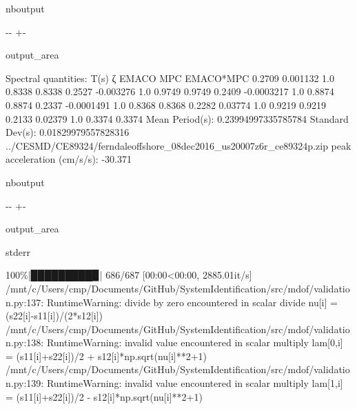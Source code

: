 \documentclass[letterpaper,10pt,english]{sphinxmanual}
\begin{document}
\begin{sphinxuseclass}{nboutput}
{

\kern-\sphinxverbatimsmallskipamount\kern-\baselineskip
\kern+\FrameHeightAdjust\kern-\fboxrule
\vspace{\nbsphinxcodecellspacing}

\begin{sphinxuseclass}{output_area}
\begin{sphinxuseclass}{}


\begin{sphinxVerbatim}[commandchars=\\\{\}]
Spectral quantities:
       T(s)        ζ        EMACO        MPC     EMACO*MPC
      0.2709     0.001132   1.0        0.8338     0.8338
      0.2527     -0.003276  1.0        0.9749     0.9749
      0.2409     -0.0003217  1.0        0.8874     0.8874
      0.2337     -0.0001491  1.0        0.8368     0.8368
      0.2282     0.03774    1.0        0.9219     0.9219
      0.2133     0.02379    1.0        0.3374     0.3374
Mean Period(s): 0.23994997335785784
Standard Dev(s): 0.01829979557828316
../CESMD/CE89324/ferndaleoffshore\_08dec2016\_us20007z6r\_ce89324p.zip
peak acceleration (cm/s/s): -30.371
\end{sphinxVerbatim}



\end{sphinxuseclass}
\end{sphinxuseclass}
}

\end{sphinxuseclass}
\begin{sphinxuseclass}{nboutput}
{

\kern-\sphinxverbatimsmallskipamount\kern-\baselineskip
\kern+\FrameHeightAdjust\kern-\fboxrule
\vspace{\nbsphinxcodecellspacing}

\begin{sphinxuseclass}{output_area}
\begin{sphinxuseclass}{stderr}


\begin{sphinxVerbatim}[commandchars=\\\{\}]
100\%|█████████▉| 686/687 [00:00<00:00, 2885.01it/s]
/mnt/c/Users/cmp/Documents/GitHub/SystemIdentification/src/mdof/validation.py:137: RuntimeWarning: divide by zero encountered in scalar divide
  nu[i]    = (s22[i]-s11[i])/(2*s12[i])
/mnt/c/Users/cmp/Documents/GitHub/SystemIdentification/src/mdof/validation.py:138: RuntimeWarning: invalid value encountered in scalar multiply
  lam[0,i] = (s11[i]+s22[i])/2 + s12[i]*np.sqrt(nu[i]**2+1)
/mnt/c/Users/cmp/Documents/GitHub/SystemIdentification/src/mdof/validation.py:139: RuntimeWarning: invalid value encountered in scalar multiply
  lam[1,i] = (s11[i]+s22[i])/2 - s12[i]*np.sqrt(nu[i]**2+1)
\end{sphinxVerbatim}



\end{sphinxuseclass}
\end{sphinxuseclass}
}

\end{sphinxuseclass}
\end{document}
